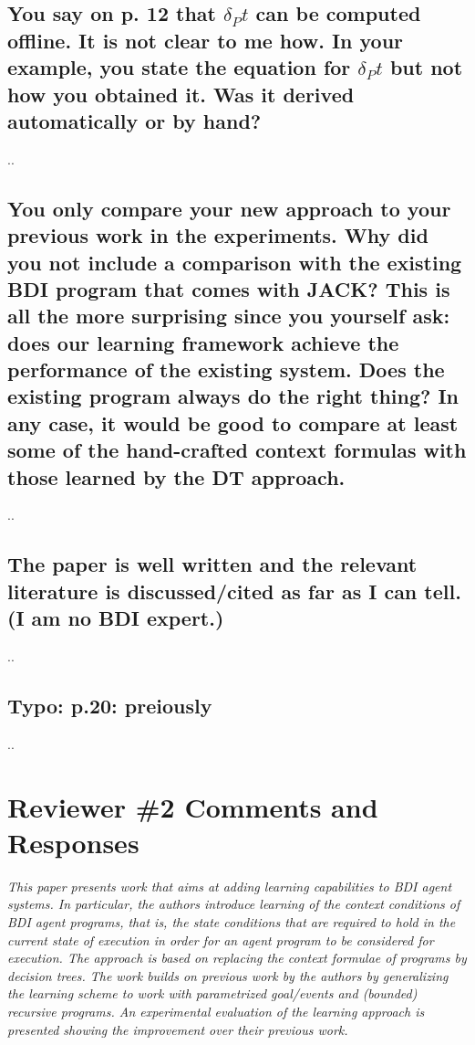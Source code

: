\documentclass[preprint,12pt]{elsarticle}
\begin{document}
\subsection{ You say on p. 12 that $\delta_Pt$ can be computed offline. It is not clear to me how. In your example, you state the equation for $\delta_Pt$ but not how you obtained it. Was it derived automatically or by hand?}

..

\subsection{ You only compare your new approach to your previous work in the experiments. Why did you not include a comparison with the existing BDI program that comes with JACK? This is all the more surprising since you yourself ask: does our learning framework achieve the performance of the existing system. Does the existing program always do the right thing? In any case, it would be good to compare at least some of the hand-crafted context formulas with those learned by the DT approach.}

..

\subsection{ The paper is well written and the relevant literature is discussed/cited as far as I can tell. (I am no BDI expert.)}

..

\subsection{ Typo: p.20: preiously}

..




\section{Reviewer \#2 Comments and Responses}

{\em This paper presents work that aims at adding learning capabilities to
BDI agent systems. In particular, the authors introduce learning of
the context conditions of BDI agent programs, that is, the state
conditions that are required to hold in the current state of execution
in order for an agent program to be considered for execution.
The approach is based on replacing the context formulae of programs by
decision trees. The work builds on previous work by the authors by
generalizing the learning scheme to work with parametrized goal/events
and (bounded) recursive programs. An experimental evaluation of the
learning approach is presented showing the improvement over their
previous work.}
\end{document}

